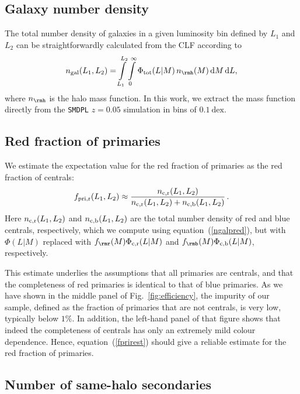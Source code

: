 \documentclass[fleqn,usenatbib,useAMS]{mnras}
\begin{document}
	\subsection{Galaxy number density}
	
	The total number density of galaxies in a given luminosity bin defined by $L_1$ and $L_2$ can be straightforwardly calculated from the CLF according to
	\begin{equation}\label{ngalpred}
	n_{\rm gal}(L_1, L_2) = \int\limits_{L_1}^{L_2} \int\limits_0^\infty \Phi_{\rm tot}(L | M) \, n_\rmh (M) \, \mathrm{d}M \, \mathrm{d}L,
	\end{equation}
	where $n_\rmh$ is the halo mass function. In this work, we extract the mass function directly from the \texttt{SMDPL} $z = 0.05$ simulation in bins of $0.1 \ \mathrm{dex}$.
	
	\subsection{Red fraction of primaries}
	
	We estimate the expectation value for the red fraction of primaries as the red fraction of centrals:
	\begin{equation}\label{fprirest}
	f_{\rm pri, r} (L_1, L_2) \approx 
	\frac{n_{\rm c, r} (L_1, L_2)}{n_{\rm c, r} (L_1, L_2) + n_{\rm c, b} (L_1, L_2)}\,.
	\end{equation}
	Here $n_{\rm c, r}(L_1, L_2)$ and  $n_{\rm c, b}(L_1, L_2)$  are the total number density of red and blue centrals, respectively, which we compute using equation~(\ref{ngalpred}), but with $\Phi(L|M)$ replaced with $f_\rmr(M) \Phi_{\rm c,r}(L|M)$ and $f_\rmb(M) \Phi_{\rm c,b}(L|M)$, respectively.
	
	This estimate underlies the assumptions that all primaries are centrals, and that the completeness of red primaries is identical to that of blue primaries. As we have shown in the middle panel of Fig.~\ref{fig:efficiency}, the impurity of our sample, defined as the fraction of primaries that are not centrals, is very low, typically below $1\%$. In addition, the left-hand panel of that figure shows that indeed the completeness of centrals has only an extremely mild colour dependence. Hence, equation~(\ref{fprirest}) should give a reliable estimate for the red fraction of primaries.
	
	\subsection{Number of same-halo secondaries}
	\label{subsec:Nsamesec}
	
\end{document}
